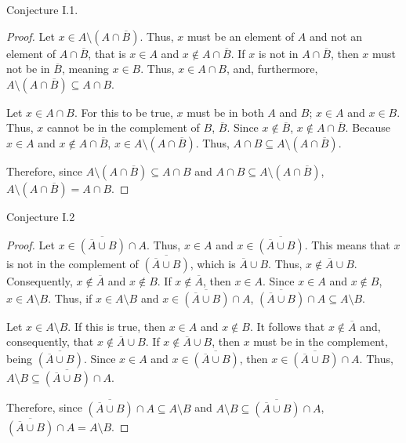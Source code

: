\documentclass[11pt,titlepage]{article}		%
\theoremstyle{theorem}
\begin{document}
Conjecture I.1.
\begin{proof}
Let $x\in A\setminus{(A \cap\overline{B})}$. Thus, $x$ must be an element of $A$ and not an element of $A\cap\overline{B}$, that is $x\in A$ and $x\not\in A\cap\overline{B}$. If $x$ is not in $A\cap\overline{B}$, then $x$ must not be in $\overline{B}$, meaning $x\in B$. Thus, $x\in A\cap B$, and, furthermore, $A\setminus{(A\cap\overline{B})}\subseteq A\cap B$.

Let $x\in A\cap B$. For this to be true, $x$ must be in both $A$ and $B$; $x\in A$ and $x\in B$. Thus, $x$ cannot be in the complement of $B$, $\overline{B}$. Since $x\not\in\overline{B}$, $x\not\in A\cap\overline{B}$. Because $x\in A$ and $x\not\in A\cap\overline{B}$, $x \in A\setminus{(A\cap\overline{B})}$. Thus, $A\cap B \subseteq A\setminus{(A\cap\overline{B})}$.

Therefore, since $A\setminus{(A\cap\overline{B})}\subseteq A\cap B$ and $A\cap B \subseteq A\setminus{(A\cap\overline{B})}$, $A\setminus{(A\cap\overline{B})} = A\cap B$.
\end{proof}

Conjecture I.2
\begin{proof}
Let $x \in \overline{(\overline{A}\cup B)}\cap A$. Thus, $x \in A$ and $ x\in \overline{(\overline{A}\cup B)}$. This means that $x$ is not in the complement of $\overline{(\overline{A}\cup B)}$, which is $\overline{A} \cup B$. Thus, $x\not\in\overline{A}\cup B$. Consequently, $x \not\in \overline{A}$ and $x\not\in B$. If $x \not\in\overline{A}$, then $x\in A$. Since $x\in A$ and $x\not\in B$, $x\in A\setminus B$. Thus, if $x \in A\setminus B$ and $x \in \overline{(\overline{A}\cup B)}\cap A$, $\overline{(\overline{A}\cup B)}\cap A \subseteq A \setminus B$.

Let $x \in A\setminus B$. If this is true, then $x \in A$ and $x\not\in B$. It follows that $x\not\in\overline{A}$ and, consequently, that $x\not\in\overline{A}\cup B$. If $x\not\in\overline{A}\cup B$, then $x$ must be in the complement, being $\overline{(\overline{A}\cup B)}$. Since $x \in A$ and $x \in \overline{(\overline{A}\cup B)}$, then $x\in \overline{(\overline{A}\cup B)}\cap A$. Thus, $A\setminus B \subseteq \overline{(\overline{A}\cup B)}\cap A$.

Therefore, since $\overline{(\overline{A}\cup B)}\cap A \subseteq A \setminus B$ and $A\setminus B \subseteq \overline{(\overline{A}\cup B)}\cap A$, $\overline{(\overline{A}\cup B)}\cap A = A \setminus B$.
\end{proof}
\end{document}
